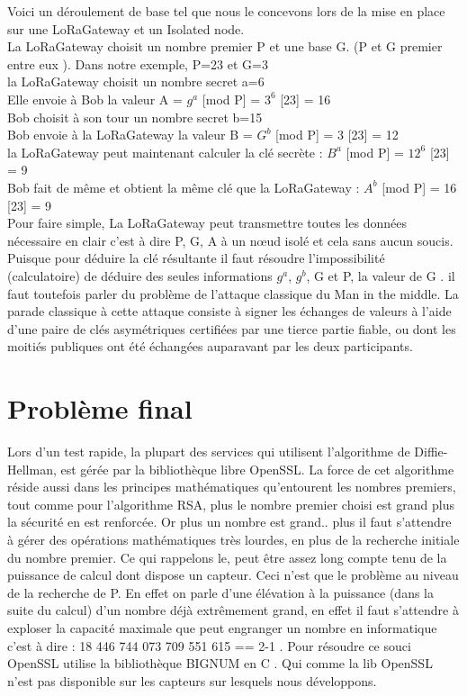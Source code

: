 \documentclass[a4paper, 11pt]{article}
\begin{document}
Voici un déroulement de base tel que nous le concevons lors de la mise en place sur une LoRaGateway et un Isolated node.\\
La LoRaGateway choisit un nombre premier P et une base G. (P et G premier entre eux ). Dans notre exemple, P=23 et G=3\\
la LoRaGateway choisit un nombre secret a=6\\
Elle envoie à Bob la valeur A = $g^a$ [mod P] = $3^6$ [23] = 16\\
Bob choisit à son tour un nombre secret b=15\\
Bob envoie à la LoRaGateway la valeur B = $G^b$ [mod P] = 3 [23] = 12\\
la LoRaGateway peut maintenant calculer la clé secrète : $B^a$ [mod P] = $12^6$ [23] = 9\\
Bob fait de même et obtient la même clé que la LoRaGateway : $A^b$ [mod P] = 16 [23] = 9\\

Pour faire simple, La LoRaGateway peut transmettre toutes les données nécessaire en clair c'est à dire P, G, A  à un n\oe{}ud isolé et cela sans aucun soucis. Puisque pour déduire la clé résultante il faut résoudre l'impossibilité (calculatoire) de déduire des seules informations $g^a$, $g^b$, G et P, la valeur de G .
il faut toutefois parler du problème de l'attaque classique du Man in the middle. La parade classique à cette attaque consiste à signer les échanges de valeurs à l'aide d'une paire de clés asymétriques certifiées par une tierce partie fiable, ou dont les moitiés publiques ont été échangées auparavant par les deux participants.

\section*{Problème final }
Lors d'un test rapide, la plupart des services qui utilisent l'algorithme de Diffie-Hellman, est gérée par la bibliothèque libre OpenSSL. La force de cet algorithme réside aussi dans les principes mathématiques qu'entourent les nombres premiers, tout comme pour l'algorithme RSA, plus le nombre premier choisi est grand plus la sécurité en est renforcée. Or plus un nombre est grand.. plus il faut s'attendre à gérer des opérations mathématiques très lourdes, en plus de la recherche initiale du nombre premier. Ce qui rappelons le, peut être assez long compte tenu de la puissance de calcul dont dispose un capteur. Ceci n'est que le problème au niveau de la recherche de P. En effet on parle d'une élévation à la puissance (dans la suite du calcul) d'un nombre déjà extrêmement grand, en effet il faut s'attendre à exploser la capacité maximale que peut engranger un nombre en informatique c'est à dire : 18 446 744 073 709 551 615 == 2-1 . Pour résoudre ce souci OpenSSL utilise la bibliothèque BIGNUM en C . Qui comme la lib OpenSSL n'est pas disponible sur les capteurs sur lesquels nous développons. 
\end{document}
